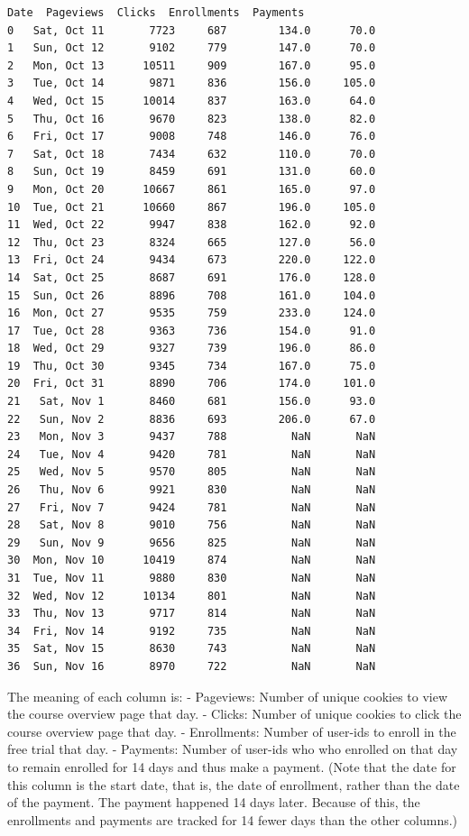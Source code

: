\documentclass[11pt]{article}
\begin{document}
    \begin{Verbatim}[commandchars=\\\{\}]
           Date  Pageviews  Clicks  Enrollments  Payments
0   Sat, Oct 11       7723     687        134.0      70.0
1   Sun, Oct 12       9102     779        147.0      70.0
2   Mon, Oct 13      10511     909        167.0      95.0
3   Tue, Oct 14       9871     836        156.0     105.0
4   Wed, Oct 15      10014     837        163.0      64.0
5   Thu, Oct 16       9670     823        138.0      82.0
6   Fri, Oct 17       9008     748        146.0      76.0
7   Sat, Oct 18       7434     632        110.0      70.0
8   Sun, Oct 19       8459     691        131.0      60.0
9   Mon, Oct 20      10667     861        165.0      97.0
10  Tue, Oct 21      10660     867        196.0     105.0
11  Wed, Oct 22       9947     838        162.0      92.0
12  Thu, Oct 23       8324     665        127.0      56.0
13  Fri, Oct 24       9434     673        220.0     122.0
14  Sat, Oct 25       8687     691        176.0     128.0
15  Sun, Oct 26       8896     708        161.0     104.0
16  Mon, Oct 27       9535     759        233.0     124.0
17  Tue, Oct 28       9363     736        154.0      91.0
18  Wed, Oct 29       9327     739        196.0      86.0
19  Thu, Oct 30       9345     734        167.0      75.0
20  Fri, Oct 31       8890     706        174.0     101.0
21   Sat, Nov 1       8460     681        156.0      93.0
22   Sun, Nov 2       8836     693        206.0      67.0
23   Mon, Nov 3       9437     788          NaN       NaN
24   Tue, Nov 4       9420     781          NaN       NaN
25   Wed, Nov 5       9570     805          NaN       NaN
26   Thu, Nov 6       9921     830          NaN       NaN
27   Fri, Nov 7       9424     781          NaN       NaN
28   Sat, Nov 8       9010     756          NaN       NaN
29   Sun, Nov 9       9656     825          NaN       NaN
30  Mon, Nov 10      10419     874          NaN       NaN
31  Tue, Nov 11       9880     830          NaN       NaN
32  Wed, Nov 12      10134     801          NaN       NaN
33  Thu, Nov 13       9717     814          NaN       NaN
34  Fri, Nov 14       9192     735          NaN       NaN
35  Sat, Nov 15       8630     743          NaN       NaN
36  Sun, Nov 16       8970     722          NaN       NaN
    \end{Verbatim}

    The meaning of each column is: - Pageviews: Number of unique cookies to
view the course overview page that day. - Clicks: Number of unique
cookies to click the course overview page that day. - Enrollments:
Number of user-ids to enroll in the free trial that day. - Payments:
Number of user-ids who who enrolled on that day to remain enrolled for
14 days and thus make a payment. (Note that the date for this column is
the start date, that is, the date of enrollment, rather than the date of
the payment. The payment happened 14 days later. Because of this, the
enrollments and payments are tracked for 14 fewer days than the other
columns.)
\end{document}
